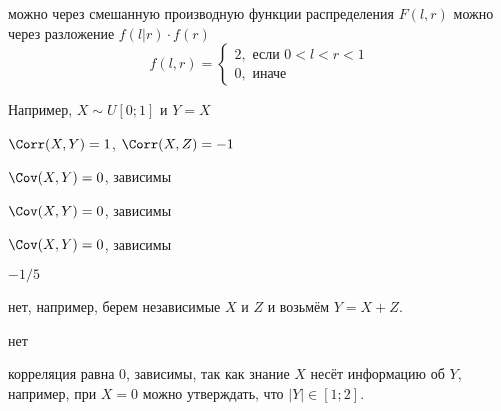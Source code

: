 \begin{solution}{8.6}
  можно через смешанную производную функции распределения $F(l,r)$
  можно через разложение $f(l|r)\cdot f(r)$
  \[
  f(l,r)=\begin{cases}
  2, \text{ если } 0<l<r<1 \\
  0, \text{ иначе }
  \end{cases}
  \]
\end{solution}
\begin{solution}{8.7}
\end{solution}
\begin{solution}{8.8}
  Например, $X\sim U[0;1]$ и $Y=X$
\end{solution}
\begin{solution}{8.9}
$\Corr(X,Y)=1$, $\Corr(X,Z)=-1$
\end{solution}
\begin{solution}{8.10}
\end{solution}
\begin{solution}{8.11}
\end{solution}
\begin{solution}{8.12}
      $\Cov(X,Y)=0$, зависимы
\end{solution}
\begin{solution}{8.13}
    $\Cov(X,Y)=0$, зависимы
\end{solution}
\begin{solution}{8.14}
  $\Cov(X,Y)=0$, зависимы
\end{solution}
\begin{solution}{8.15}
  $-1/5$
\end{solution}
\begin{solution}{8.16}
\end{solution}
\begin{solution}{8.17}
\end{solution}
\begin{solution}{8.18}
\end{solution}
\begin{solution}{8.19}
  нет, например, берем независимые $X$ и $Z$ и возьмём $Y=X+Z$.
\end{solution}
\begin{solution}{8.20}
нет
\end{solution}
\begin{solution}{8.21}
  корреляция равна $0$, зависимы, так как знание $X$ несёт информацию об $Y$, например, при $X=0$ можно утверждать, что $|Y| \in [1;2]$.
\end{solution}
\begin{solution}{9.1}
\end{solution}
